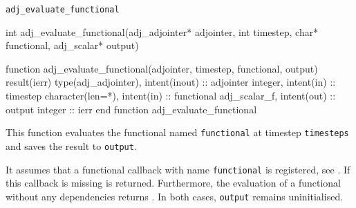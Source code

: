 
\begin{boxwithtitle}{\texttt{adj_evaluate_functional}}
\begin{minipage}{\columnwidth}
\begin{ccode}
  int adj_evaluate_functional(adj_adjointer* adjointer, int timestep, 
                              char* functional, adj_scalar* output)
\end{ccode}
\begin{fortrancode}   
  function adj_evaluate_functional(adjointer, timestep, functional, output) 
           result(ierr)
    type(adj_adjointer), intent(inout) :: adjointer
    integer, intent(in) :: timestep
    character(len=*), intent(in) :: functional
    adj_scalar_f, intent(out) :: output
    integer :: ierr
  end function adj_evaluate_functional
\end{fortrancode}
\end{minipage}
\end{boxwithtitle}

This function evaluates the functional named \texttt{functional} at timestep \texttt{timesteps} and saves the result to \texttt{output}.

It assumes that a functional callback with name \texttt{functional} is registered, see . 
If this callback is missing  is returned.
Furthermore, the evaluation of a functional without any dependencies returns . 
In both cases, \texttt{output} remains uninitialised.

